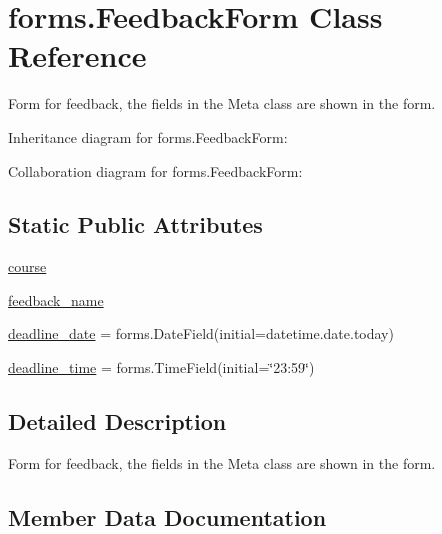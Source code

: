 \hypertarget{classforms_1_1_feedback_form}{}\section{forms.\+Feedback\+Form Class Reference}
\label{classforms_1_1_feedback_form}


Form for feedback, the fields in the Meta class are shown in the form.  




Inheritance diagram for forms.\+Feedback\+Form\+:


Collaboration diagram for forms.\+Feedback\+Form\+:
\subsection*{Static Public Attributes}
\begin{DoxyCompactItemize}
\item 
\hyperlink{classforms_1_1_feedback_form_ad2ca6f3b844aa3f80f8326428e83bacd}{course}
\item 
\hyperlink{classforms_1_1_feedback_form_a489414513306b7666bb4a9249ff2ad16}{feedback\+\_\+name}
\item 
\hyperlink{classforms_1_1_feedback_form_a5ccea176478e091bcaf31375ce6c53fa}{deadline\+\_\+date} = forms.\+Date\+Field(initial=datetime.\+date.\+today)
\item 
\hyperlink{classforms_1_1_feedback_form_aa0b66f54d93476e3eaf7ee49e33df1a4}{deadline\+\_\+time} = forms.\+Time\+Field(initial=\char`\"{}23\+:59\char`\"{})
\end{DoxyCompactItemize}


\subsection{Detailed Description}
Form for feedback, the fields in the Meta class are shown in the form. 

\subsection{Member Data Documentation}
